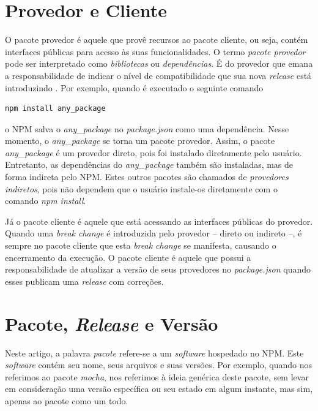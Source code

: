 \section{Provedor e Cliente}
\label{ref-teo:prov_clie}
O pacote provedor é aquele que provê recursos ao pacote cliente, ou seja, contém interfaces públicas para acesso às suas funcionalidades. O termo \textit{pacote provedor} pode ser interpretado como \textit{bibliotecas} ou \textit{dependências}. É do provedor que emana a responsabilidade de indicar o nível de compatibilidade que sua nova \textit{release} está introduzindo \cite{teorical_reference:semver}. Por exemplo, quando é executado o seguinte comando

\begin{lstlisting}[style=bash, label=cod:install:provider]
npm install any_package
\end{lstlisting}
o \gls{NPM} salva o \textit{any\_package} no \textit{package.json} como uma dependência. Nesse momento, o \textit{any\_package} se torna um pacote provedor. Assim, o pacote \textit{any\_package} é um provedor direto, pois foi instalado diretamente pelo usuário. Entretanto, as dependências do \textit{any\_package} também são instaladas, mas de forma indireta pelo \gls{NPM}. Estes outros pacotes são chamados de \textit{provedores indiretos}, pois não dependem que o usuário instale-os diretamente com o comando \textit{npm install}.

Já o pacote cliente é aquele que está acessando as interfaces públicas do provedor. Quando uma \textit{break change} é introduzida pelo provedor -- direto ou indireto --, é sempre no pacote cliente que esta \textit{break change} se manifesta, causando o encerramento da execução. O pacote cliente é aquele que possui a responsabilidade de atualizar a versão de seus provedores no \textit{package.json} quando esses publicam uma \textit{release} com correções.

\section{Pacote, \textit{Release} e Versão}
\label{ref-teo:pac_rel_ver}
Neste artigo, a palavra \textit{pacote} refere-se a um \textit{software} hospedado no \gls{NPM}. Este \textit{software} contém seu nome, seus arquivos e suas versões. Por exemplo, quando nos referimos ao pacote \textit{mocha}, nos referimos à ideia genérica deste pacote, sem levar em consideração uma versão específica ou seu estado em algum instante, mas sim, apenas ao pacote como um todo.

